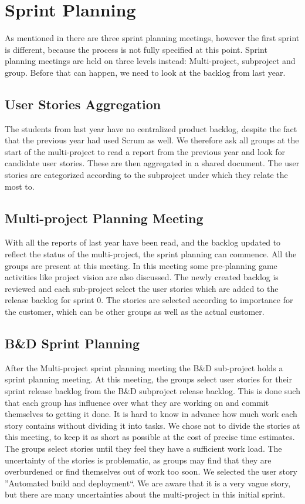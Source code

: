 \chapter{Sprint Planning}\label{chap:sprint1_planning}
As mentioned in  there are three sprint planning meetings, however the first sprint is different, because the process is not fully specified at this point. Sprint planning meetings are held on three levels instead: Multi-project, subproject and group. Before that can happen, we need to look at the backlog from last year.

\section{User Stories Aggregation}
The students from last year have no centralized product backlog, despite the fact that the previous year had used Scrum as well. We therefore ask all groups at the start of the multi-project to read a report from the previous year and look for candidate user stories. These are then aggregated in a shared document. The user stories are categorized according to the subproject under which they relate the most to.

\section{Multi-project Planning Meeting}

With all the reports of last year have been read, and the backlog updated to reflect the status of the multi-project, the sprint planning can commence. All the groups are present at this meeting. In this meeting some pre-planning game activities like project vision are also discussed. The newly created backlog is reviewed and each sub-project select the user stories which are added to the release backlog for sprint 0. The stories are selected according to importance for the customer, which can be other groups as well as the actual customer.

\section{B\&D Sprint Planning}

After the Multi-project sprint planning meeting the B\&D sub-project holds a sprint planning meeting. At this meeting, the groups select user stories for their sprint release backlog from the B\&D subproject release backlog. This is done such that each group has influence over what they are working on and commit themselves to getting it done. It is hard to know in advance how much work each story contains without dividing it into tasks. We chose not to divide the stories at this meeting, to keep it as short as possible at the cost of precise time estimates. The groups select stories until they feel they have a sufficient work load. The uncertainty of the stories is problematic, as groups may find that they are overburdened or find themselves out of work too soon. We selected the user story ''Automated build and deployment``. We are aware that it is a very vague story, but there are many uncertainties about the multi-project in this initial sprint.

